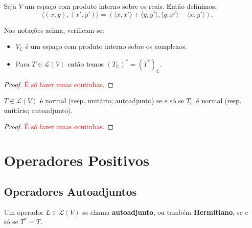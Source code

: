 \documentclass[11pt,twoside,a4paper]{book}
\begin{document}
\begin{definicao}
Seja $V$ um espaço com produto interno sobre os reais. Então definimos:
\[
\langle(x,y),(x',y')\rangle=\left(\langle x,x'\rangle+\langle y,y'\rangle,\langle y,x'\rangle-\langle x,y'\rangle\right).
\]
\end{definicao}

\begin{proposicao}
Nas notações acima, verificam-se:
\begin{itemize}
\item $V_\mathbb{C}$ é um espaço com produto interno sobre os complexos.
\item Para $T\in\mathcal{L}(V)$ então temos $(T_\mathbb{C})^*=(T^*)_\mathbb{C}.$
\end{itemize}
\end{proposicao}
\begin{proof}
\textcolor{red}{É só fazer umas continhas.}
\end{proof}

\begin{corolario}
$T\in\mathcal{L}(V)$ é normal (resp. unitário; autoadjunto) se e só se $T_\mathbb{C}$ é normal (resp. unitário; autoadjunto).
\end{corolario}
\begin{proof}
\textcolor{red}{É só fazer umas continhas.}
\end{proof}

\newpage

\section{Operadores Positivos}

\subsection{Operadores Autoadjuntos}

\begin{definicao}
Um operador $L\in\mathcal{L}(V)$ se chama \textbf{autoadjunto}, ou também \textbf{Hermitiano}, se e só se $T^*=T.$
\end{definicao}
\end{document}
